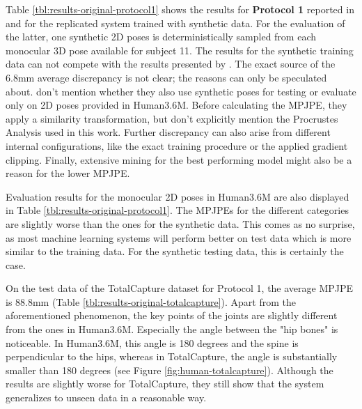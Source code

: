 



Table \ref{tbl:results-original-protocol1} shows the results for \textbf{Protocol 1} reported in \cite{drover18} and for the replicated system trained with synthetic data.
For the evaluation of the latter, one synthetic 2D poses is deterministically sampled from each monocular 3D pose available for subject 11.
The results for the synthetic training data can not compete with the results presented by \citet{drover18}.
The exact source of the 6.8mm average discrepancy is not clear; the reasons can only be speculated about.
\citet{drover18} don't mention whether they also use synthetic poses for testing or evaluate only on 2D poses provided in Human3.6M.
Before calculating the MPJPE, they apply a similarity transformation, but don't explicitly mention the Procrustes Analysis used in this work.
Further discrepancy can also arise from different internal configurations, like the exact training procedure or the applied gradient clipping.
Finally, extensive mining for the best performing model might also be a reason for the lower MPJPE.

Evaluation results for the monocular 2D poses in Human3.6M are also displayed in Table \ref{tbl:results-original-protocol1}.
The MPJPEs for the different categories are slightly worse than the ones for the synthetic data.
This comes as no surprise, as most machine learning systems will perform better on test data which is more similar to the training data.
For the synthetic testing data, this is certainly the case.

On the test data of the TotalCapture dataset for Protocol 1, the average MPJPE is 88.8mm (Table \ref{tbl:results-original-totalcapture}).
Apart from the aforementioned phenomenon, the key points of the joints are slightly different from the ones in Human3.6M.
Especially the angle between the "hip bones" is noticeable.
In Human3.6M, this angle is 180 degrees and the spine is perpendicular to the hips, whereas in TotalCapture, the angle is substantially smaller than 180 degrees (see Figure \ref{fig:human-totalcapture}).
Although the results are slightly worse for TotalCapture, they still show that the system generalizes to unseen data in a reasonable way.



